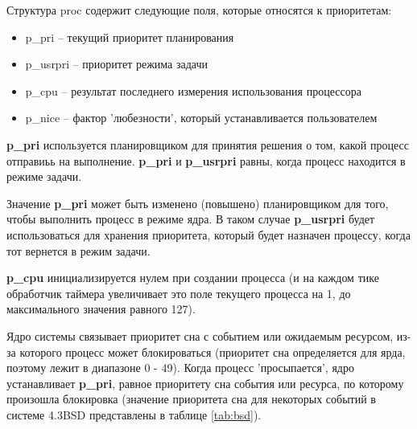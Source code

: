 Структура proc содержит следующие поля, которые относятся к приоритетам:
\begin{itemize}
	\item p\_pri -- текущий приоритет планирования
	\item p\_usrpri -- приоритет режима задачи
	\item p\_cpu -- результат последнего измерения использования процессора
	\item p\_nice -- фактор 'любезности', который устанавливается пользователем
\end{itemize}

\textbf{p\_pri} используется планировщиком для принятия решения о том, какой процесс отправиьь на выполнение. \textbf{p\_pri} и \textbf{p\_usrpri} равны, когда процесс находится в режиме задачи. 

Значение \textbf{p\_pri} может быть изменено (повышено) планировщиком для того, чтобы выполнить процесс в режиме ядра. В таком случае \textbf{p\_usrpri} будет использоваться для хранения приоритета, который будет назначен процессу, когда тот вернется в режим задачи.

\textbf{p\_cpu} инициализируется нулем при создании процесса (и на каждом тике обработчик таймера увеличивает это поле текущего процесса на 1, до максимального значения равного 127).

Ядро системы связывает приоритет сна с событием или ожидаемым ресурсом, из-за которого процесс может блокироваться (приоритет сна определяется для ярда, поэтому лежит в диапазоне 0 - 49). Когда процесс 'просыпается', ядро устанавливает \textbf{p\_pri}, равное приоритету сна события или ресурса, по которому произошла блокировка (значение приоритета сна для некоторых событий в системе 4.3BSD представлены в таблице \ref{tab:bsd}).



